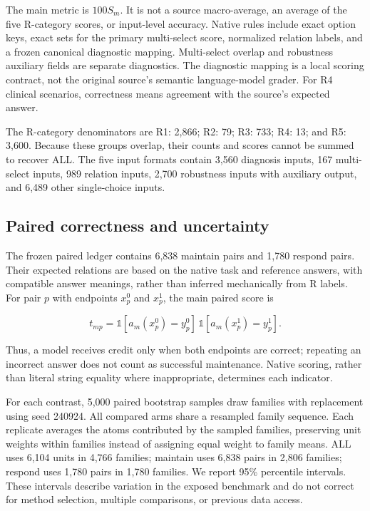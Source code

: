 \documentclass[
  english,
  11pt,
]{article}
\begin{document}
The main metric is \(100S_m\). It is not a source macro-average, an
average of the five R-category scores, or input-level accuracy. Native
rules include exact option keys, exact sets for the primary multi-select
score, normalized relation labels, and a frozen canonical diagnostic
mapping. Multi-select overlap and robustness auxiliary fields are
separate diagnostics. The diagnostic mapping is a local scoring
contract, not the original source's semantic language-model grader. For
R4 clinical scenarios, correctness means agreement with the source's
expected answer.

The R-category denominators are R1: 2,866; R2: 79; R3: 733; R4: 13; and
R5: 3,600. Because these groups overlap, their counts and scores cannot
be summed to recover ALL. The five input formats contain 3,560 diagnosis
inputs, 167 multi-select inputs, 989 relation inputs, 2,700 robustness
inputs with auxiliary output, and 6,489 other single-choice inputs.

\subsection{Paired correctness and
uncertainty}\label{paired-correctness-and-uncertainty}

The frozen paired ledger contains 6,838 maintain pairs and 1,780 respond
pairs. Their expected relations are based on the native task and
reference answers, with compatible answer meanings, rather than inferred
mechanically from R labels. For pair \(p\) with endpoints \(x_p^0\) and
\(x_p^1\), the main paired score is

\[
t_{mp}=\mathbb{1}[a_m(x_p^0)=y_p^0]\,
       \mathbb{1}[a_m(x_p^1)=y_p^1].
\]

Thus, a model receives credit only when both endpoints are correct;
repeating an incorrect answer does not count as successful maintenance.
Native scoring, rather than literal string equality where inappropriate,
determines each indicator.

For each contrast, 5,000 paired bootstrap samples draw families with
replacement using seed 240924. All compared arms share a resampled
family sequence. Each replicate averages the atoms contributed by the
sampled families, preserving unit weights within families instead of
assigning equal weight to family means. ALL uses 6,104 units in 4,766
families; maintain uses 6,838 pairs in 2,806 families; respond uses
1,780 pairs in 1,780 families. We report 95\% percentile intervals.
These intervals describe variation in the exposed benchmark and do not
correct for method selection, multiple comparisons, or previous data
access.
\end{document}
